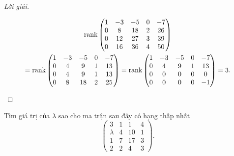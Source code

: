 \begin{proof}[Lời giải]
\begin{enumerate}[label = (\alph*)]
\begin{gather*}
                  \text{rank}\begin{pmatrix}
                      1 & -3 & -5 & 0 & -7 \\
                      0 & 8  & 18 & 2 & 26 \\
                      0 & 12 & 27 & 3 & 39 \\
                      0 & 16 & 36 & 4 & 50
                  \end{pmatrix} \\
                  =\text{rank}\begin{pmatrix}
                      1 & -3 & -5 & 0 & -7 \\
                      0 & 4  & 9  & 1 & 13 \\
                      0 & 4  & 9  & 1 & 13 \\
                      0 & 8  & 18 & 2 & 25
                  \end{pmatrix}
                  =\text{rank}\begin{pmatrix}
                      1 & -3 & -5 & 0 & -7 \\
                      0 & 4  & 9  & 1 & 13 \\
                      0 & 0  & 0  & 0 & 0  \\
                      0 & 0  & 0  & 0 & -1
                  \end{pmatrix}
                  = 3.
              \end{gather*}
              \endgroup{}
    \end{enumerate}
\end{proof}

\begin{exercise}
    Tìm giá trị của $\lambda$ sao cho ma trận sau đây có hạng thấp nhất
    \[
        \begin{pmatrix}
            3       & 1 & 1  & 4 \\
            \lambda & 4 & 10 & 1 \\
            1       & 7 & 17 & 3 \\
            2       & 2 & 4  & 3
        \end{pmatrix}.
    \]
\end{exercise}

